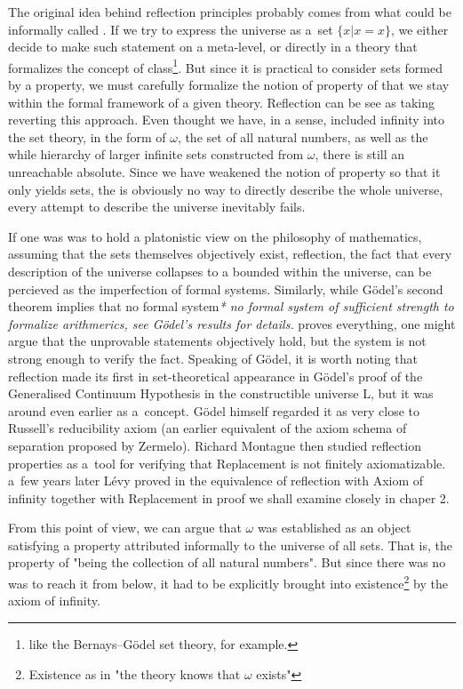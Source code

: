 \documentclass[12pt,a4paper]{article}
\begin{document}
The original idea behind reflection principles probably comes from what could be informally called .
If we try to express the universe as a~set $\{x  |  x = x\}$, we either decide to make such statement on a meta-level, or directly in a theory that formalizes the concept of class\footnote{like the Bernays–Gödel set theory, for example.}. But since it is practical to consider sets formed by a property, we must carefully formalize the notion of property of that we stay within the formal framework of a given theory. Reflection can be see as taking reverting this approach. Even thought we have, in a sense, included infinity into the set theory, in the form of $\omega$, the set of all natural numbers, as well as the while hierarchy of larger infinite sets constructed from $\omega$, there is still an unreachable absolute. Since we have weakened the notion of property so that it only yields sets, the is obviously no way to directly describe the whole universe, every attempt to describe the universe inevitably fails.

If one was was to hold a platonistic view on the philosophy of mathematics, assuming that the sets themselves objectively exist, reflection, the fact that every description of the universe collapses to a bounded within the universe, can be percieved as the imperfection of formal systems. Similarly, while Gödel's second theorem implies that no formal system\emph{* no formal system of sufficient strength to formalize arithmerics, see Gödel's results for details.} proves everything, one might argue that the unprovable statements objectively hold, but the system is not strong enough to verify the fact. Speaking of Gödel, it is worth noting that reflection made its first in set-theoretical appearance in G{\"o}del's proof of the Generalised Continuum Hypothesis in the constructible universe L, but it was around even earlier as a~concept. G{\"o}del himself regarded it as very close to Russell's reducibility axiom (an earlier equivalent of the axiom schema of separation proposed by Zermelo). Richard Montague then studied reflection properties as a~tool for verifying that Replacement is not finitely axiomatizable. a~few years later Lévy proved in \cite{Levy60a} the equivalence of reflection with Axiom of infinity together with Replacement in proof we shall examine closely in chaper 2.

From this point of view, we can argue that $\omega$ was established as an object satisfying a property attributed informally to the universe of all sets. That is, the property of "being the collection of all natural numbers". But since there was no was to reach it from below, it had to be explicitly brought into existence\footnote{Existence as in "the theory knows that $\omega$ exists"} by the axiom of infinity. 
\end{document}
